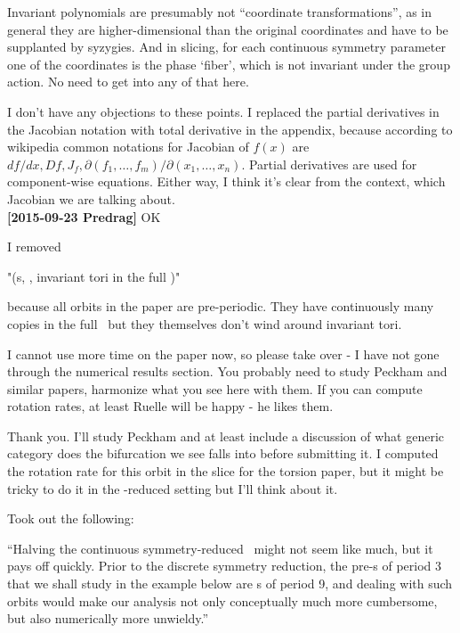 \begin{description}
Invariant polynomials are presumably not ``coordinate transformations'',
as in general they are higher-dimensional than the original coordinates
and have to be supplanted by syzygies. And in slicing, for each
continuous symmetry parameter one of the coordinates is the phase
`fiber', which is not invariant under the group action. No need to get
into any of that here.

\item[2015-09-23 Burak] I don't have any objections to these points.
I replaced the partial derivatives in the Jacobian notation with total
derivative in the appendix, because according to
{wikipedia}
common notations for Jacobian of
$f(x)$ are $df/dx, Df, J_f,
\partial (f_1, \ldots, f_m) / \partial (x_1, \ldots, x_n)$. Partial derivatives
are used for component-wise equations. Either way, I think it's clear from the
context, which Jacobian we are talking about.
\\
{\bf [2015-09-23 Predrag]} OK

\item[2015-09-21 Burak] I removed

"(\rpo s, \ie, invariant tori in the full \statesp)"

because all orbits in the paper are pre-periodic. They have continuously
many copies in the full \statesp\ but they themselves don't wind around
invariant tori.

\item[2015-09-23 Predrag] I cannot use more time on the paper now, so
please take over - I have not gone through the numerical results section.
You probably need to study Peckham and similar papers,
harmonize what you see here with them. If you can compute rotation rates, at
least Ruelle will be happy - he likes them.

\item[2015-09-23 Burak] Thank you. I'll study Peckham and at least include a
discussion of what generic category does the bifurcation we see falls into
before submitting it. I computed the rotation rate for this orbit in the slice
for the torsion paper, but it might be tricky to do it in the -reduced
setting but I'll think about it.

\item[2015-09-26 Burak] Took out the following:

``Halving the  continuous symmetry-reduced \statesp\ might not seem
like much, but it pays off quickly. Prior to the discrete symmetry
reduction, the pre-\po s of period 3 that we shall study in the example
below are \po s of period 9, and dealing with such orbits would make our
analysis not only conceptually much more cumbersome, but also numerically
more unwieldy.''


\end{description}
